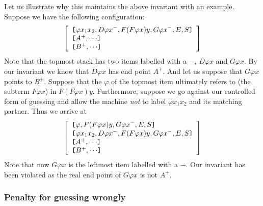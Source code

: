 Let us illustrate why this maintains the above invariant with an
example. Suppose we have the following configuration:
\begin{equation}
\nonumber \left [\begin{array}{l}
\hbox{\tt [}{\varphi x_1 x_2, {D \varphi x}^{-}, F(F\varphi x)y, {G\varphi
x}^-, E, S}\hbox{\tt ]}\\
\hbox{\tt [}{A^+, \cdots}\hbox{\tt ]}\\
\hbox{\tt [}{B^+, \cdots}\hbox{\tt ]}
\end{array} \right ]
\end{equation}
Note that the topmost stack has two items labelled with a $-$, $D
\varphi x$ and $G \varphi x$. By our invariant we know that $D \varphi
x$ has end point $A^+$. And let us suppose that $G \varphi x$ points
to $B^+$. Suppose that the $\varphi$ of the topmost item ultimately
refers to (the subterm $F \varphi x$) in $F(F \varphi x)
y$. Furthermore, suppose we go against our controlled form of guessing
and allow the machine \emph{not} to label $\varphi x_1 x_2$ and its
matching partner. Thus we arrive at
\begin{equation}
\nonumber \left [ \begin{array}{l}
\hbox{\tt [}{ \varphi, F(F\varphi x)y, {G\varphi x}^-, E, S}\hbox{\tt ]}\\
\hbox{\tt [}{\varphi x_1 x_2, {D \varphi x}^{-}, F(F\varphi x)y, {G\varphi
x}^-, E, S}\hbox{\tt ]}\\
\hbox{\tt [}{A^+, \cdots}\hbox{\tt ]}\\
\hbox{\tt [}{B^+, \cdots}\hbox{\tt ]}
\end{array} \right ]
\end{equation}
Note that now $G \varphi x$ is the leftmost item labelled with a
$-$. Our invariant has been violated as the real end point of $G
\varphi x$ is not $A^+$.


\subsubsection*{Penalty for guessing wrongly}


